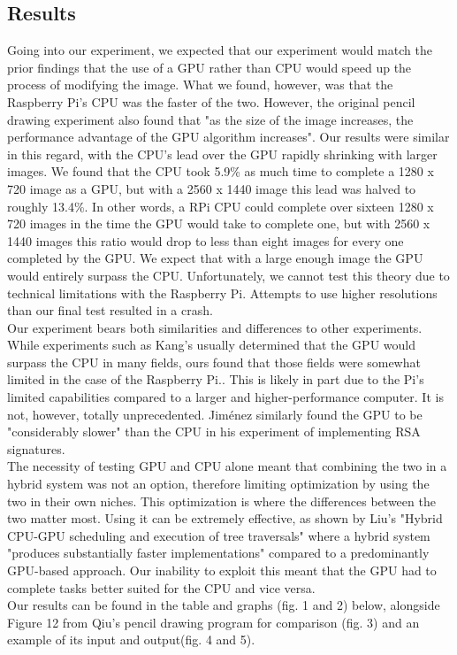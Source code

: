 \documentclass[conference]{IEEEtran}
\begin{document}
\subsection{Results}
Going into our experiment, we expected that our experiment would match the prior findings that the use of a GPU rather than CPU would speed up the process of modifying the image. What we found, however, was that the Raspberry Pi's CPU was the faster of the two. However, the original pencil drawing experiment also found that "as the size of the image increases, the performance advantage of the GPU algorithm increases"\cite{Liu}. Our results were similar in this regard, with the CPU's lead over the GPU rapidly shrinking with larger images. We found that the CPU took 5.9\% as much time to complete a 1280 x 720 image as a GPU, but with a 2560 x 1440 image this lead was halved to roughly 13.4\%. In other words, a RPi CPU could complete over sixteen 1280 x 720 images in the time the GPU would take to complete one, but with 2560 x 1440 images this ratio would drop to less than eight images for every one completed by the GPU. We expect that with a large enough image the GPU would entirely surpass the CPU. Unfortunately, we cannot test this theory due to technical limitations with the Raspberry Pi. Attempts to use higher resolutions than our final test resulted in a crash.\\
Our experiment bears both similarities and differences to other experiments. While experiments such as Kang's usually determined that the GPU would surpass the CPU in many fields, ours found that those fields were somewhat limited in the case of the Raspberry Pi.\cite{Kang}. This is likely in part due to the Pi's limited capabilities compared to a larger and higher-performance computer. It is not, however, totally unprecedented. Jiménez similarly found the GPU to be "considerably slower" than the CPU in his experiment of implementing RSA signatures.\\
The necessity of testing GPU and CPU alone meant that combining the two in a hybrid system was not an option, therefore limiting optimization by using the two in their own niches. This optimization is where the differences between the two matter most. Using it can be extremely effective, as shown by Liu's "Hybrid CPU-GPU scheduling and execution of tree traversals" where a hybrid system "produces substantially faster implementations" compared to a predominantly GPU-based approach\cite{Jianqiao}. Our inability to exploit this meant that the GPU had to complete tasks better suited for the CPU and vice versa.\\
Our results can be found in the table and graphs (fig. 1 and 2) below, alongside Figure 12 from Qiu's pencil drawing program for comparison (fig. 3) and an example of its input and output(fig. 4 and 5).
\end{document}
